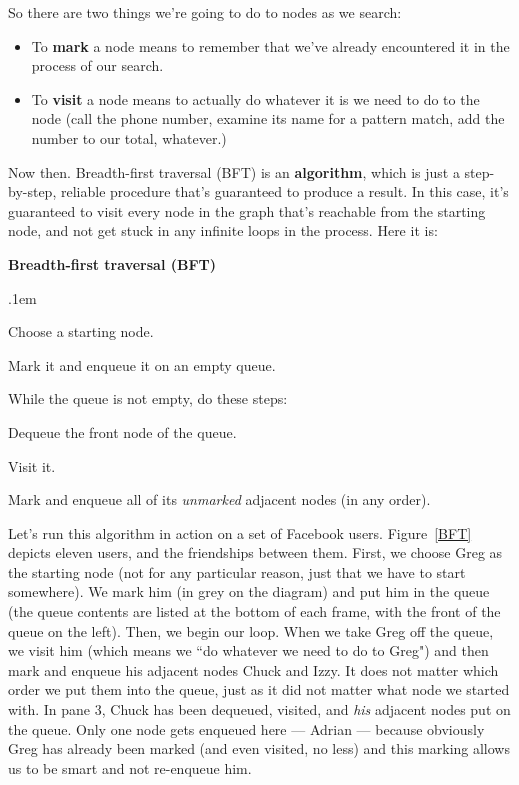 So there are two things we're going to do to nodes as we search:

\begin{itemize} 
\item To \textbf{mark} a node means to remember that we've already
encountered it in the process of our search.
\item To \textbf{visit} a node means to actually do whatever it is we need
to do to the node (call the phone number, examine its name for a pattern
match, add the number to our total, whatever.)
\end{itemize} 

Now then. Breadth-first traversal (BFT) is an \textbf{algorithm}, which is
just a step-by-step, reliable procedure that's guaranteed to produce a
result. In this case, it's guaranteed to visit every node in the graph
that's reachable from the starting node, and not get stuck in any infinite
loops in the process. Here it is:

\vspace{.1in}
\begin{framed}
\textbf{Breadth-first traversal (BFT)}
\begin{compactenum}
\itemsep.1em
\item Choose a starting node.
\item Mark it and enqueue it on an empty queue.
\item While the queue is not empty, do these steps:
    \begin{compactenum}
    \item Dequeue the front node of the queue.
    \item Visit it.
    \item Mark and enqueue all of its \textit{unmarked} adjacent nodes (in
any order).
    \end{compactenum}
\end{compactenum}
\end{framed}
\vspace{.2in}

Let's run this algorithm in action on a set of Facebook users. 
Figure~\ref{BFT} depicts eleven users, and the friendships between them.
First, we choose Greg as the starting node (not for any particular reason,
just that we have to start somewhere). We mark him (in grey on the diagram)
and put him in the queue (the queue contents are listed at the bottom of
each frame, with the front of the queue on the left). Then, we begin our
loop. When we take Greg off the queue, we visit him (which means we ``do
whatever we need to do to Greg") and then mark and enqueue his adjacent
nodes Chuck and Izzy. It does not matter which order we put them into the
queue, just as it did not matter what node we started with. In pane 3,
Chuck has been dequeued, visited, and \textit{his} adjacent nodes put on
the queue. Only one node gets enqueued here --- Adrian --- because
obviously Greg has already been marked (and even visited, no less) and this
marking allows us to be smart and not re-enqueue him.

